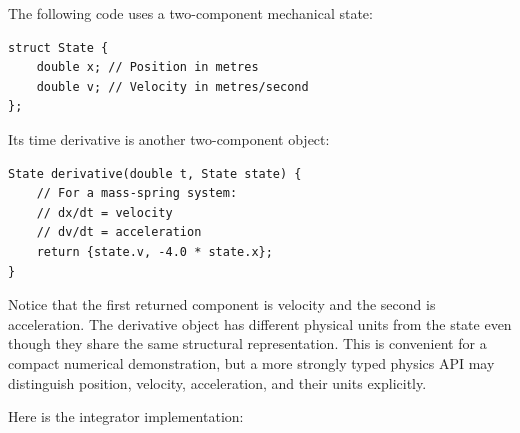 \hypertarget{02-foundations-ii-ch025-explicit-semi-implicit-midpoint-heun-and-rk4-implementations}{}

The following code uses a two-component mechanical state:

\begin{verbatim}
struct State {
    double x; // Position in metres
    double v; // Velocity in metres/second
};
\end{verbatim}

Its time derivative is another two-component object:

\begin{verbatim}
State derivative(double t, State state) {
    // For a mass-spring system:
    // dx/dt = velocity
    // dv/dt = acceleration
    return {state.v, -4.0 * state.x};
}
\end{verbatim}

Notice that the first returned component is velocity and the second is acceleration. The derivative object has different physical units from the state even though they share the same structural representation. This is convenient for a compact numerical demonstration, but a more strongly typed physics API may distinguish position, velocity, acceleration, and their units explicitly.

Here is the integrator implementation:


